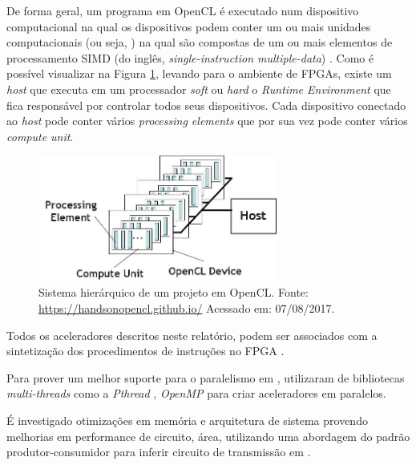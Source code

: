          De forma geral, um programa em OpenCL é executado num dispositivo computacional na qual os dispositivos podem conter um ou mais unidades computacionais (ou seja, \cores) na qual são compostas de um ou mais elementos de processamento SIMD (do inglês, \textit{single-instruction multiple-data}) \citep{Stone2010}.
         Como é possível visualizar na Figura \ref{fig:opencl}, levando para o ambiente de FPGAs, existe um \textit{host} que executa em um processador \textit{soft} ou \textit{hard} o \textit{ Runtime Environment} que fica responsável por controlar todos seus dispositivos.
         Cada dispositivo conectado ao \textit{host} pode conter vários \textit{processing elements} que por sua vez pode conter vários \textit{compute unit}.

         \begin{figure}[h] \centering
            \includegraphics[width=0.7\textwidth]{img/opencl.jpg}
            \caption{Sistema hierárquico de um projeto em OpenCL. Fonte: \url{https://handsonopencl.github.io/} Acessado em: 07/08/2017.}
            \label{fig:opencl}
         \end{figure}

         Todos os aceleradores descritos neste relatório, podem ser associados com a sintetização dos procedimentos de instruções no FPGA \citep{Shagrithaya2013, Czajkowski2012}.

   		Para prover um melhor suporte para o paralelismo em \hardware, utilizaram de bibliotecas \textit{multi-threads} como a \textit{Pthread} \citep{Barney2009}, \textit{OpenMP} \citep{openmp} para criar aceleradores em \hardwares paralelos.

         É investigado otimizações em memória e arquitetura de sistema provendo melhorias em performance de circuito, área, utilizando uma abordagem do padrão produtor-consumidor para inferir circuito de transmissão em \hardware.

